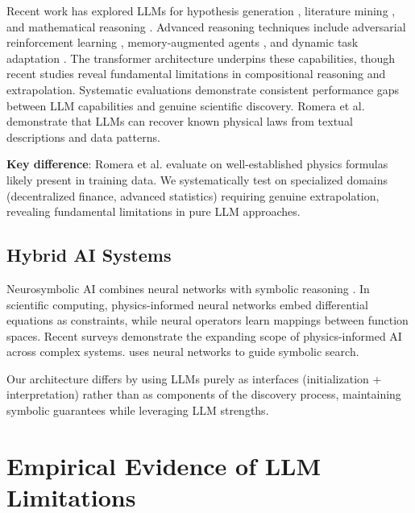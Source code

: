 \documentclass[twoside,11pt]{article}
\begin{document}
Recent work has explored LLMs for hypothesis generation \citep{wang2023scientific}, literature mining \citep{liu2023summary}, and mathematical reasoning \citep{wei2022chain,zhang2025survey}. Advanced reasoning techniques include adversarial reinforcement learning \citep{liu2025adversarial}, memory-augmented agents \citep{yan2026memory}, and dynamic task adaptation \citep{wang2025reasoning}. The transformer architecture \citep{vaswani2017attention} underpins these capabilities, though recent studies \citep{mirzadeh2024reasoning,dziri2023faith,xu2025fundamental,tian2025reasoning} reveal fundamental limitations in compositional reasoning and extrapolation. Systematic evaluations \citep{du2025evaluating,chen2025epistemic} demonstrate consistent performance gaps between LLM capabilities and genuine scientific discovery. Romera et al. \citep{romera2023discovering} demonstrate that LLMs can recover known physical laws from textual descriptions and data patterns.

\textbf{Key difference}: Romera et al. evaluate on well-established physics formulas likely present in training data. We systematically test on specialized domains (decentralized finance, advanced statistics) requiring genuine extrapolation, revealing fundamental limitations in pure LLM approaches.

\subsection{Hybrid AI Systems}

Neurosymbolic AI combines neural networks with symbolic reasoning \citep{garcez2019neural,kautz2020third}. In scientific computing, physics-informed neural networks \citep{raissi2019physics,karniadakis2021physics} embed differential equations as constraints, while neural operators \citep{lu2021learning,li2020fourier} learn mappings between function spaces. Recent surveys \citep{li2026physics} demonstrate the expanding scope of physics-informed AI across complex systems. \citet{udrescu2020ai} uses neural networks to guide symbolic search.

Our architecture differs by using LLMs purely as interfaces (initialization + interpretation) rather than as components of the discovery process, maintaining symbolic guarantees while leveraging LLM strengths.

\section{Empirical Evidence of LLM Limitations}
\label{sec:llm_limitations}
\end{document}
